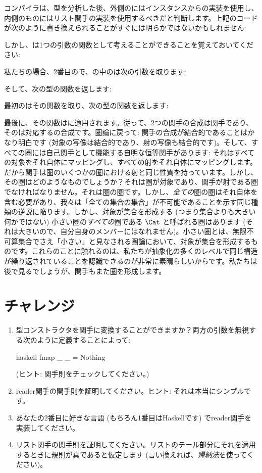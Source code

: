 コンパイラは、型を分析した後、外側のにはインスタンスからの実装を使用し、内側のものにはリスト関手の実装を使用するべきだと判断します。上記のコードが次のように書き換えられることがすぐには明らかではないかもしれません: 

しかし、は1つの引数の関数として考えることができることを覚えておいてください: 

私たちの場合、2番目ので、の中のは次の引数を取ります: 

そして、次の型の関数を返します: 

最初のはその関数を取り、次の型の関数を返します: 

最後に、その関数はに適用されます。従って、2つの関手の合成は関手であり、そのは対応するの合成です。圏論に戻って: 関手の合成が結合的であることはかなり明白です (対象の写像は結合的であり、射の写像も結合的です)。そして、すべての圏には自己関手として機能する自明な恒等関手があります: それはすべての対象をそれ自体にマッピングし、すべての射をそれ自体にマッピングします。だから関手は圏のいくつかの圏における射と同じ性質を持っています。しかし、その圏はどのようなものでしょうか？それは圏が対象であり、関手が射である圏でなければなりません。それは圏の圏です。しかし、\emph{全ての}圏の圏はそれ自体を含む必要があり、我々は「全ての集合の集合」が不可能であることを示す同じ種類の逆説に陥ります。しかし、対象が集合を形成する (つまり集合よりも大きい何かではない) 小さい圏の\emph{すべての}圏である $\Cat$ と呼ばれる圏はあります (それは大きいので、自分自身のメンバーにはなれません)。小さい圏とは、無限不可算集合でさえ「小さい」と見なされる圏論において、対象が集合を形成するものです。これらのことに触れるのは、私たちが抽象化の多くのレベルで同じ構造が繰り返されていることを認識できるのが非常に素晴らしいからです。私たちは後で見るでしょうが、関手もまた圏を形成します。

\section{チャレンジ}

\begin{enumerate}
  \tightlist
  \item
         型コンストラクタを関手に変換することができますか？両方の引数を無視する次のように定義することによって: 

        \begin{snip}{haskell}
fmap _ _ = Nothing
\end{snip}

         (ヒント: 関手則をチェックしてください。) 
  \item
        reader関手の関手則を証明してください。ヒント: それは本当にシンプルです。
  \item
        あなたの2番目に好きな言語 (もちろん1番目はHaskellです) でreader関手を実装してください。
  \item
        リスト関手の関手則を証明してください。リストのテール部分にそれを適用するときに規則が真であると仮定します (言い換えれば、\emph{帰納法}を使ってください)。
\end{enumerate}

